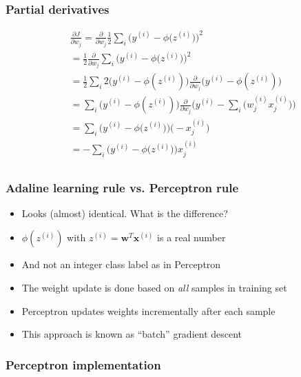 \documentclass{beamer}
\begin{document}
\begin{frame}
  \frametitle{Partial derivatives}
  \begin{equation*}
    \begin{split}
      & \frac{\partial J}{\partial w_j} = \frac{\partial}{\partial w_j} \frac{1}{2} \sum_i \bigg(  y^{(i)} - \phi \big( z^{(i)} \big)  \bigg)^2 \\
      & = \frac{1}{2} \frac{\partial}{\partial w_j} \sum_i \bigg(  y^{(i)} - \phi \big( z^{(i)} \big)  \bigg)^2 \\
      & = \frac{1}{2} \sum_i 2 \big( y^{(i)} - \phi(z^{(i)})\big)  \frac{\partial}{\partial w_j} \Big( y^{(i)}  - \phi({z^{(i)}}) \Big) \\
      & = \sum_i \big( y^{(i)}  - \phi (z^{(i)})   \big) \frac{\partial}{\partial w_j} \Big( y^{(i)} - \sum_i \big(w^{(i)}_{j} x^{(i)}_{j} \big) \Big) \\
      & = \sum_i \bigg(  y^{(i)} - \phi \big( z^{(i)} \big)  \bigg) \bigg( - x_{j}^{(i)} \bigg) \\
      & = - \sum_i \bigg(  y^{(i)} - \phi \big( z^{(i)} \big)  \bigg) x_{j}^{(i)}  \\
    \end{split}
  \end{equation*}
\end{frame}

\begin{frame}
  \frametitle{Adaline learning rule vs. Perceptron rule}
  \begin{itemize}
  \item Looks (almost) identical. What is the difference?
  \item $\phi(z^{(i)})$ with $z^{(i)} = \mathbf{w}^T \mathbf{x}^{(i)}$ is a real number
  \item And not an integer class label as in Perceptron
  \item The weight update is done based on \emph{all} samples in training set
  \item Perceptron updates weights incrementally after each sample
    \item This approach is known as ``batch'' gradient descent
  \end{itemize}
\end{frame}

\begin{frame}
  \frametitle{Perceptron implementation}
  \href{https://github.com/rasbt/python-machine-learning-book/blob/master/code/ch02/ch02.ipynb}{}
\end{frame}
\end{document}
